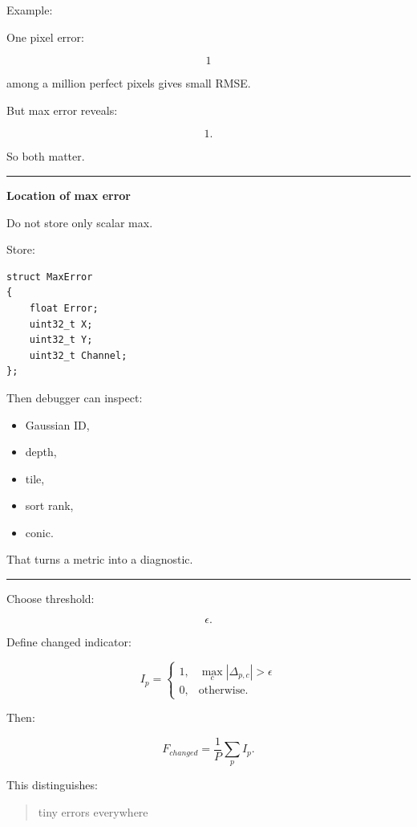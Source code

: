 Example:

One pixel error:

\[
1
\]

among a million perfect pixels gives small RMSE.

But max error reveals:

\[
1.
\]

So both matter.

\begin{center}\rule{0.5\linewidth}{0.5pt}\end{center}

\textbf{Location of max error}

Do not store only scalar max.

Store:

\protect{}\label{vgsyyh}%
\begin{verbatim}
struct MaxError
{
    float Error;
    uint32_t X;
    uint32_t Y;
    uint32_t Channel;
};
\end{verbatim}

Then debugger can inspect:

\begin{itemize}
\tightlist
\item
  Gaussian ID,
\item
  depth,
\item
  tile,
\item
  sort rank,
\item
  conic.
\end{itemize}

That turns a metric into a diagnostic.

\begin{center}\rule{0.5\linewidth}{0.5pt}\end{center}

Choose threshold:

\[
\epsilon.
\]

Define changed indicator:

\[
I_p=
\begin{cases}
1,&
\max_c|\Delta_{p,c}|>\epsilon\\
0,&
\text{otherwise}.
\end{cases}
\]

Then:

\[
\boxed{
F_{changed}
=
\frac1P
\sum_p I_p.
}
\]

This distinguishes:

\begin{quote}
tiny errors everywhere
\end{quote}

